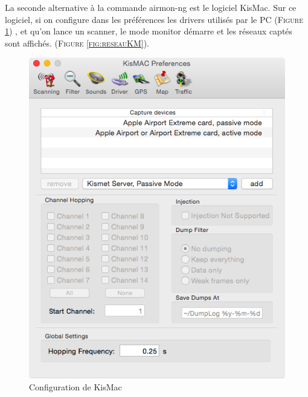 \documentclass[11pt]{article}
\begin{document}
La seconde alternative à la commande airmon-ng est le logiciel KisMac. Sur ce logiciel, si on configure dans les préférences les drivers utilisés par le PC (\textsc{Figure \ref{fig:driverKM}}) , et qu'on lance un scanner, le mode monitor démarre et les réseaux captés sont affichés. (\textsc{Figure \ref{fig:reseauKM}}). 

\begin{figure}[hbtp]
        \centering \includegraphics[scale=0.4]{Exercice1/driverKM.png}
        \caption{Configuration de KisMac}
         \label{fig:driverKM}
\end{figure}
\end{document}
